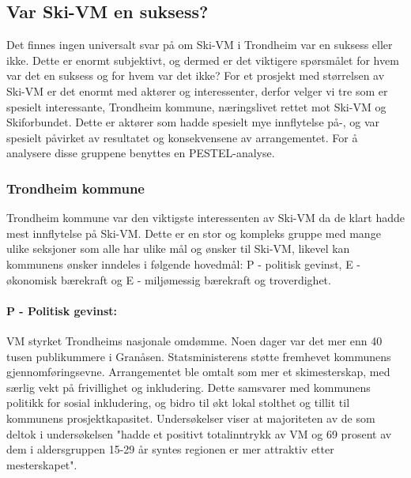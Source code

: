 \subsection{Var Ski-VM en suksess?}
Det finnes ingen universalt svar på om Ski-VM i Trondheim var en suksess eller ikke.
Dette er enormt subjektivt, og dermed er det viktigere spørsmålet for hvem
var det en suksess og for hvem var det ikke? For et prosjekt med størrelsen av Ski-VM er det
enormt med aktører og interessenter, derfor velger vi tre som er spesielt interessante,
Trondheim kommune, næringslivet rettet mot Ski-VM og Skiforbundet. Dette er aktører som hadde
spesielt mye innflytelse på-, og var spesielt påvirket av resultatet og konsekvensene av
arrangementet. For å analysere disse gruppene benyttes en PESTEL-analyse\parencite[][s.219]{Teknologiledelse}.

\subsubsection{Trondheim kommune}
Trondheim kommune var den viktigste interessenten av Ski-VM da de klart hadde mest
innflytelse på Ski-VM. Dette er en stor og kompleks gruppe med mange ulike seksjoner som
alle har ulike mål og ønsker til Ski-VM, likevel kan kommunens ønsker inndeles i
følgende hovedmål: P - politisk gevinst, E - økonomisk bærekraft og E - miljømessig bærekraft og troverdighet.

\paragraph{P - Politisk gevinst:} VM styrket Trondheims nasjonale omdømme. Noen dager var det mer enn 40 tusen publikummere i Granåsen\parencite{NRKFolkefest}. Statsministerens støtte fremhevet kommunens gjennomføringsevne\parencite{Trondheim2025Midler}. Arrangementet ble omtalt som mer et skimesterskap, med særlig vekt på frivillighet og inkludering\parencite{Trondheim2025Baerekraft}. Dette samsvarer med kommunens politikk for sosial inkludering, og bidro til økt lokal stolthet og tillit til kommunens prosjektkapasitet. Undersøkelser viser at majoriteten av de som deltok i undersøkelsen "hadde et positivt totalinntrykk av VM og 69 prosent av dem i aldersgruppen 15-29 år syntes regionen er mer attraktiv etter mesterskapet"\parencite{AftenpostenNyVM}.

